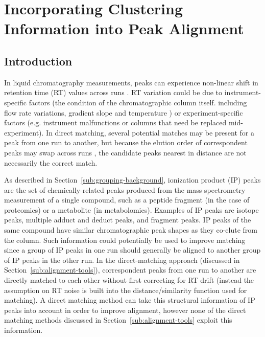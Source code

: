 \chapter{Incorporating Clustering Information into Peak Alignment}
\label{c:matching}


\section{Introduction}

In liquid chromatography measurements, peaks can experience non-linear shift in retention time (RT) values across runs \cite{Podwojski2009}. RT variation could be due to instrument-specific factors (the condition of the chromatographic column itself. including flow rate variations, gradient slope and temperature \cite{Christin2008}) or experiment-specific factors (e.g. instrument malfunctions or columns that need be replaced mid-experiment). In direct matching, several potential matches may be present for a peak from one run to another, but because the elution order of correspondent peaks may swap across runs \cite{Smith2013}, the candidate peaks nearest in distance are not necessarily the correct match.

As described in Section~\ref{sub:grouping-background}, ionization product (IP) peaks are the set of chemically-related peaks produced from the mass spectrometry measurement of a single compound, such as a peptide fragment (in the case of proteomics) or a metabolite (in metabolomics). Examples of IP peaks are isotope peaks, multiple adduct and deduct peaks, and fragment peaks. IP peaks of the same compound have similar chromatographic peak shapes as they co-elute from the column. Such information could potentially be used to improve matching since a group of IP peaks in one run should generally be aligned to another group of IP peaks in the other run. In the direct-matching approach (discussed in Section~\ref{sub:alignment-tools}), correspondent peaks from one run to another are directly matched to each other without first correcting for RT drift (instead the assumption on RT noise is built into the distance/similarity function used for matching). A direct matching method can take this structural information of IP peaks into account in order to improve alignment, however none of the direct matching methods discussed in Section~\ref{sub:alignment-tools} exploit this information.

